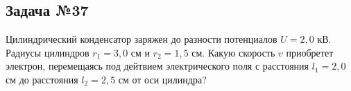 \subsection{Задача №37}

Цилиндрический конденсатор заряжен до разности потенциалов $U = 2,0$ кВ. Радиусы цилиндров $r_1 = 3,0$ см и $r_2 = 1,5$ см. Какую скорость $v$ приобретет электрон, перемещаясь под дейтвием электрического поля с расстояния $l_1 = 2,0$ см до расстояния $l_2 = 2,5$ см от оси цилиндра?
